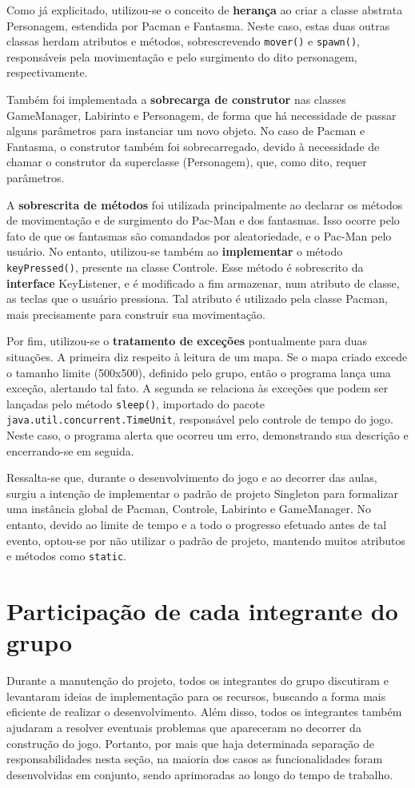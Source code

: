 \documentclass[]{article}
\begin{document}
Como já explicitado, utilizou-se o conceito de \textbf{herança} ao criar a classe abstrata Personagem, estendida por Pacman e Fantasma. Neste caso, estas duas outras classas herdam atributos e métodos, sobrescrevendo \texttt{mover()} e \texttt{spawn()}, responsáveis pela movimentação e pelo surgimento do dito personagem, respectivamente.

Também foi implementada a \textbf{sobrecarga de construtor} nas classes GameManager, Labirinto e Personagem, de forma que há necessidade de passar alguns parâmetros para instanciar um novo objeto. No caso de Pacman e Fantasma, o construtor também foi sobrecarregado, devido à necessidade de chamar o construtor da superclasse (Personagem), que, como dito, requer parâmetros.

A \textbf{sobrescrita de métodos} foi utilizada principalmente ao declarar os métodos de movimentação e de surgimento do Pac-Man e dos fantasmas. Isso ocorre pelo fato de que os fantasmas são comandados por aleatoriedade, e o Pac-Man pelo usuário. No entanto, utilizou-se também ao \textbf{implementar} o método \texttt{keyPressed()}, presente na classe Controle. Esse método é sobrescrito da \textbf{interface} KeyListener, e é modificado a fim armazenar, num atributo de classe, as teclas que o usuário pressiona. Tal atributo é utilizado pela classe Pacman, mais precisamente para construir sua movimentação.

Por fim, utilizou-se o \textbf{tratamento de exceções} pontualmente para duas situações. A primeira diz respeito à leitura de um mapa. Se o mapa criado excede o tamanho limite (500x500), definido pelo grupo, então o programa lança uma exceção, alertando tal fato. A segunda se relaciona às exceções que podem ser lançadas pelo método \texttt{sleep()}, importado do pacote \texttt{java.util.concurrent.TimeUnit}, responsável pelo controle de tempo do jogo. Neste caso, o programa alerta que ocorreu um erro, demonstrando sua descrição e encerrando-se em seguida.

Ressalta-se que, durante o desenvolvimento do jogo e ao decorrer das aulas, surgiu a intenção de implementar o padrão de projeto Singleton para formalizar uma instância global de Pacman, Controle, Labirinto e GameManager. No entanto, devido ao limite de tempo e a todo o progresso efetuado antes de tal evento, optou-se por não utilizar o padrão de projeto, mantendo muitos atributos e métodos como \texttt{static}.

\section{Participação de cada integrante do grupo}
Durante a manutenção do projeto, todos os integrantes do grupo discutiram e levantaram ideias de implementação para os recursos, buscando a forma mais eficiente de realizar o desenvolvimento. Além disso, todos os integrantes também ajudaram a resolver eventuais problemas que apareceram no decorrer da construção do jogo. Portanto, por mais que haja determinada separação de responsabilidades nesta seção, na maioria dos casos as funcionalidades foram desenvolvidas em conjunto, sendo aprimoradas ao longo do tempo de trabalho.
\end{document}
